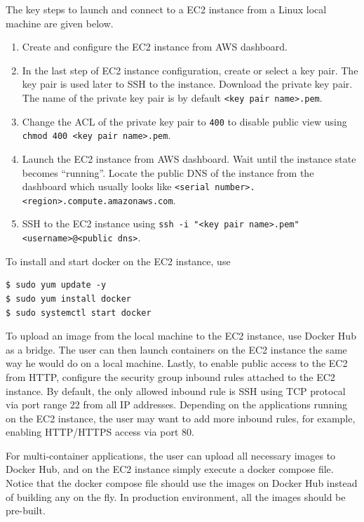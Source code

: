 The key steps to launch and connect to a EC2 instance from a Linux local machine are given below.
\begin{enumerate}
  \item Create and configure the EC2 instance from AWS dashboard.
  \item In the last step of EC2 instance configuration, create or select a key pair. The key pair is used later to SSH to the instance. Download the private key pair. The name of the private key pair is by default \verb|<key pair name>.pem|. 
  \item Change the ACL of the private key pair to \verb|400| to disable public view using \texttt{chmod 400 <key pair name>.pem}.
  \item Launch the EC2 instance from AWS dashboard. Wait until the instance state becomes ``running''. Locate the public DNS of the instance from the dashboard which usually looks like \texttt{<serial number>.<region>.compute.amazonaws.com}.
  \item SSH to the EC2 instance using \texttt{ssh -i "<key pair name>.pem" <username>@<public dns>}.
\end{enumerate}
To install and start docker on the EC2 instance, use
\begin{lstlisting}
$ sudo yum update -y
$ sudo yum install docker
$ sudo systemctl start docker
\end{lstlisting}
To upload an image from the local machine to the EC2 instance, use Docker Hub as a bridge. The user can then launch containers on the EC2 instance the same way he would do on a local machine. Lastly, to enable public access to the EC2 from HTTP, configure the security group inbound rules attached to the EC2 instance. By default, the only allowed inbound rule is SSH using TCP protocal via port range 22 from all IP addresses. Depending on the applications running on the EC2 instance, the user may want to add more inbound rules, for example, enabling HTTP/HTTPS access via port 80.

For multi-container applications, the user can upload all necessary images to Docker Hub, and on the EC2 instance simply execute a docker compose file. Notice that the docker compose file should use the images on Docker Hub instead of building any on the fly. In production environment, all the images should be pre-built.

